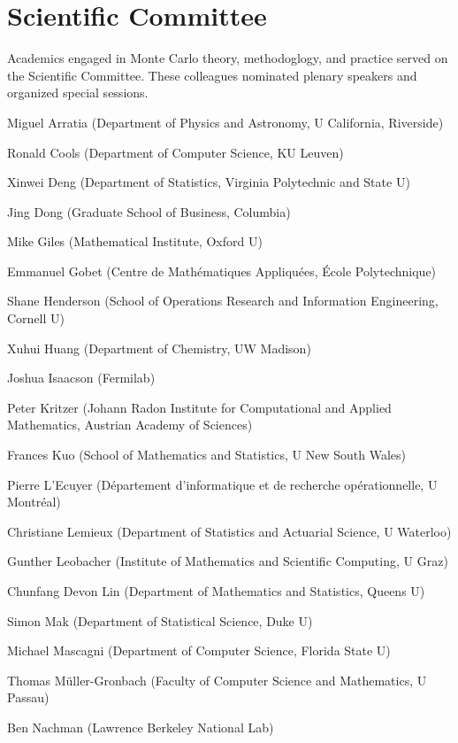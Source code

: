 \section{Scientific Committee}

Academics engaged in Monte Carlo theory, methodoglogy, and practice served on the Scientific Committee.  These colleagues nominated plenary speakers and organized special sessions.


\setlength{\columnsep}{1cm}
\begin{multicols}{2}
\raggedright
Miguel Arratia (Department of Physics and Astronomy, U California, Riverside)

Ronald Cools (Department of Computer Science, KU Leuven)

Xinwei Deng (Department of Statistics, Virginia Polytechnic and State U)

Jing Dong (Graduate School of Business, Columbia)

Mike Giles (Mathematical Institute, Oxford U)

Emmanuel Gobet (Centre de Mathématiques Appliquées, École Polytechnique)

Shane Henderson (School of Operations Research and Information Engineering, Cornell U)

Xuhui Huang (Department of Chemistry, UW Madison)

Joshua Isaacson (Fermilab)

Peter Kritzer (Johann Radon Institute for Computational and Applied Mathematics, Austrian Academy of Sciences)

Frances Kuo (School of Mathematics and Statistics, U New South Wales)

Pierre L'Ecuyer (Département d'informatique et de recherche opérationnelle, U Montréal)

Christiane Lemieux (Department of Statistics and Actuarial Science, U Waterloo)

Gunther Leobacher (Institute of Mathematics and Scientific Computing, U Graz)

Chunfang Devon Lin (Department of Mathematics and Statistics, Queens U)

Simon Mak (Department of Statistical Science, Duke U)

Michael Mascagni (Department of Computer Science, Florida State U)

Thomas Müller-Gronbach (Faculty of Computer Science and Mathematics, U Passau)

Ben Nachman (Lawrence Berkeley National Lab)


\end{multicols}
